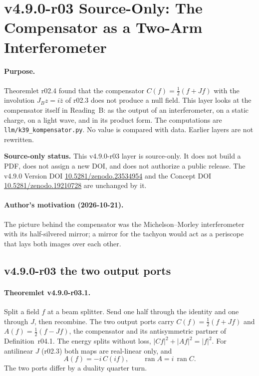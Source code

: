 \clearpage
\section*{v4.9.0-r03 Source-Only: The Compensator as a Two-Arm Interferometer}
\label{sec:v490-r03-compensator-interferometer}

\paragraph{Purpose.}
Theoremlet r02.4 found that the compensator \(C(f)=\tfrac12(f+Jf)\) with the involution \(J_Bz=i\bar z\) of r02.3 does
not produce a null field.  This layer looks at the compensator itself in Reading~B: as the output of an interferometer,
on a static charge, on a light wave, and in its product form.  The computations are \texttt{llm/k39\_kompensator.py}.
No value is compared with data.  Earlier layers are not rewritten.

\noindent\textbf{Source-only status.}
This v4.9.0-r03 layer is source-only.  It does not build a PDF, does not assign a new DOI,
and does not authorize a public release.  The v4.9.0 Version DOI
\href{https://doi.org/10.5281/zenodo.23534954}{10.5281/zenodo.23534954} and the Concept DOI
\href{https://doi.org/10.5281/zenodo.19210728}{10.5281/zenodo.19210728} are unchanged by it.

\paragraph{Author's motivation (2026-10-21).}
The picture behind the compensator was the Michelson--Morley interferometer with its half-silvered mirror; a mirror
for the tachyon would act as a periscope that lays both images over each other.

\subsection*{v4.9.0-r03 the two output ports}
\label{subsec:v490-r03-ports}

\paragraph{Theoremlet v4.9.0-r03.1.}
Split a field \(f\) at a beam splitter.  Send one half through the identity and one through \(J\), then recombine.  The
two output ports carry \(C(f)=\tfrac12(f+Jf)\) and \(A(f)=\tfrac12(f-Jf)\), the compensator and its antisymmetric
partner of Definition~r04.1.  The energy splits without loss, \(|Cf|^2+|Af|^2=|f|^2\).  For antilinear \(J\) (r02.3) both
maps are real-linear only, and
\[
A(f)=-i\,C(if),\qquad \operatorname{ran}A=i\,\operatorname{ran}C .
\]
The two ports differ by a duality quarter turn.

